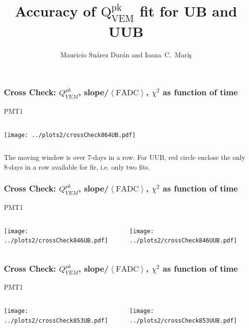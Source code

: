 \documentclass[aspectratio=169]{beamer}
\title{Accuracy of $\mathrm{Q}^{\mathrm{pk}}_{\mathrm{VEM}}$ fit for UB and UUB}
\author{
  Mauricio Su\'arez Dur\'an and Ioana~C.~Mari\c{s}
}
\institute{IIHE-ULB}
\begin{document}
\begin{frame}
  \titlepage
\end{frame}

\begin{frame}
  \frametitle{Cross Check: $Q^{pk}_{VEM}$,
  slope/$\left<\mathrm{FADC}\right>$, $\chi^2$ as function of time}
  PMT1
  \vspace{0.5cm}
  \begin{columns}
    \begin{column}{0.5\textwidth}
      \texttt{[image: ../plots2/crossCheck864UB.pdf]}
    \end{column}
    \begin{column}{0.5\textwidth}
    \end{column}
  \end{columns}
  The moving window is over 7-days in a row. For UUB, red circle enclose
  the only 8-days in a row available for fir, i.e. only two fits.
\end{frame}

\begin{frame}
  \frametitle{Cross Check: $Q^{pk}_{VEM}$,
  slope/$\left<\mathrm{FADC}\right>$, $\chi^2$ as function of time}
  PMT1
  \vspace{0.5cm}
  \begin{columns}
    \begin{column}{0.5\textwidth}
      \texttt{[image: ../plots2/crossCheck846UB.pdf]}
    \end{column}
    \begin{column}{0.5\textwidth}
      \texttt{[image: ../plots2/crossCheck846UUB.pdf]}
    \end{column}
  \end{columns}
\end{frame}

\begin{frame}
  \frametitle{Cross Check: $Q^{pk}_{VEM}$,
  slope/$\left<\mathrm{FADC}\right>$, $\chi^2$ as function of time}
  PMT1
  \vspace{0.5cm}
  \begin{columns}
    \begin{column}{0.5\textwidth}
      \texttt{[image: ../plots2/crossCheck853UB.pdf]}
    \end{column}
    \begin{column}{0.5\textwidth}
      \texttt{[image: ../plots2/crossCheck853UUB.pdf]}
    \end{column}
  \end{columns}
\end{frame}
\end{document}
